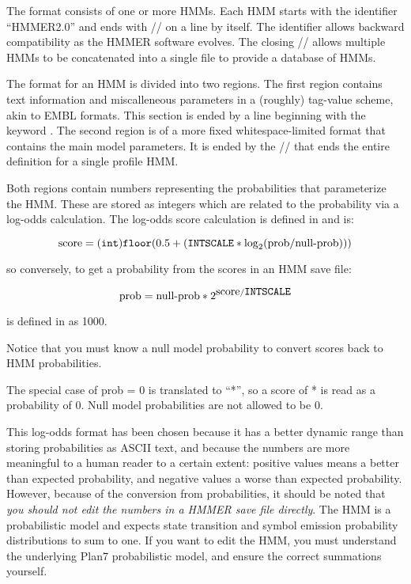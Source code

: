 The format consists of one or more HMMs. Each HMM starts with the
identifier ``HMMER2.0'' and ends with // on a line by itself. The
identifier allows backward compatibility as the HMMER software
evolves. The closing // allows multiple HMMs to be concatenated into a
single file to provide a database of HMMs.

The format for an HMM is divided into two regions. The first region
contains text information and miscalleneous parameters in a (roughly)
tag-value scheme, akin to EMBL formats. This section is ended by a
line beginning with the keyword . The second region is of a
more fixed whitespace-limited format that contains the main model
parameters. It is ended by the // that ends the entire definition for
a single profile HMM.

Both regions contain numbers representing the probabilities that
parameterize the HMM.  These are stored as integers which are related
to the probability via a log-odds calculation. The log-odds score
calculation is defined in  and is:

\[
\mbox{score} = (\mbox{\texttt{int}}) \mbox{\texttt{floor}}(0.5 + (\mbox{\texttt{INTSCALE}} * \log_2(\mbox{prob}/\mbox{null-prob})))
\]

so conversely, to get a probability from the scores in an HMM save
file:

\[
\mbox{prob} = \mbox{null-prob} * 2^{\mbox{score}/\mbox{\texttt{INTSCALE}}}
\]

 is defined in  as 1000. 

Notice that you must know a null model probability to convert scores
back to HMM probabilities. 

The special case of prob = 0 is translated to ``*'', so a score of *
is read as a probability of 0. Null model probabilities are not
allowed to be 0.

This log-odds format has been chosen because it has a better dynamic
range than storing probabilities as ASCII text, and because the
numbers are more meaningful to a human reader to a certain extent:
positive values means a better than expected probability, and negative
values a worse than expected probability.  However, because of the
conversion from probabilities, it should be noted that {\em you should
not edit the numbers in a HMMER save file directly}. The HMM is a
probabilistic model and expects state transition and symbol emission
probability distributions to sum to one. If you want to edit the HMM,
you must understand the underlying Plan7 probabilistic model, and
ensure the correct summations yourself.

